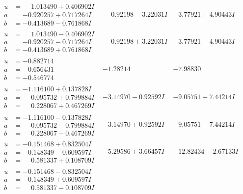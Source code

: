 \documentclass[1p]{elsarticle_modified}
\theoremstyle{definition}
\begin{document}
$$\begin{array}{c|c|c}
\begin{aligned}
u &= \phantom{-}1.013490 + 0.406902 I \\
a &= -0.920257 + 0.717264 I \\
b &= -0.413689 - 0.761868 I\end{aligned}
 & \phantom{-}0.92198 - 3.22031 I & -3.77921 + 4.90443 I \\ \hline\begin{aligned}
u &= \phantom{-}1.013490 - 0.406902 I \\
a &= -0.920257 - 0.717264 I \\
b &= -0.413689 + 0.761868 I\end{aligned}
 & \phantom{-}0.92198 + 3.22031 I & -3.77921 - 4.90443 I \\ \hline\begin{aligned}
u &= -0.882714\phantom{ +0.000000I} \\
a &= -0.656431\phantom{ +0.000000I} \\
b &= -0.546774\phantom{ +0.000000I}\end{aligned}
 & -1.28214\phantom{ +0.000000I} & -7.98830\phantom{ +0.000000I} \\ \hline\begin{aligned}
u &= -1.116100 + 0.137828 I \\
a &= \phantom{-}0.095732 + 0.799884 I \\
b &= \phantom{-}0.228067 + 0.467269 I\end{aligned}
 & -3.14970 - 0.92592 I & -9.05751 + 7.44214 I \\ \hline\begin{aligned}
u &= -1.116100 - 0.137828 I \\
a &= \phantom{-}0.095732 - 0.799884 I \\
b &= \phantom{-}0.228067 - 0.467269 I\end{aligned}
 & -3.14970 + 0.92592 I & -9.05751 - 7.44214 I \\ \hline\begin{aligned}
u &= -0.151468 + 0.832504 I \\
a &= -0.148349 - 0.609597 I \\
b &= \phantom{-}0.581337 + 0.108709 I\end{aligned}
 & -5.29586 + 3.66457 I & -12.82434 - 2.67133 I \\ \hline\begin{aligned}
u &= -0.151468 - 0.832504 I \\
a &= -0.148349 + 0.609597 I \\
b &= \phantom{-}0.581337 - 0.108709 I\end{aligned}

\end{array}$$
\end{document}
